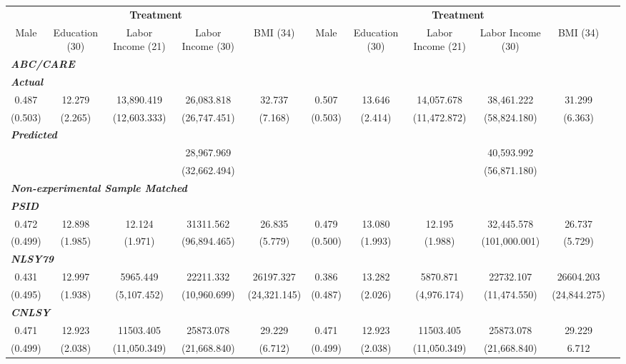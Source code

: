 \begin{tabular}{ccccccccccc} \hline \hline
\multicolumn{5}{c}{\textbf{Treatment}} & \multicolumn{5}{c}{\textbf{Treatment}} \\
Male  & Education (30)  & Labor Income (21) & Labor Income (30)  & BMI (34) & Male  & Education (30)  & Labor Income (21) & Labor Income (30)  & BMI (34)  \\  \midrule
\multicolumn{10}{l}{\textit{\textbf{ABC/CARE}}} \\
\multicolumn{10}{l}{\textit{\textbf{Actual}}} \\
    0.487 &    12.279 & 13,890.419 & 26,083.818 &    32.737 &     0.507 &    13.646 & 14,057.678 & 38,461.222 &    31.299 \\  
    (0.503) &     (2.265) & (12,603.333) & (26,747.451) &     (7.168) &     (0.503) &     (2.414) & (11,472.872) & (58,824.180) &     (6.363) \\  
\multicolumn{10}{l}{\textit{\textbf{Predicted}}} \\
        &         &         & 28,967.969 &         &         &         &         & 40,593.992 &         \\  
        &         &         & (32,662.494) &         &         &         &         & (56,871.180) &         \\  
        \multicolumn{10}{l}{\textit{\textbf{Non-experimental Sample Matched}}} \\
\multicolumn{10}{l}{\textit{\textbf{PSID}}} \\
    0.472 &    12.898 &    12.124 & 31311.562 &    26.835 &     0.479 &    13.080 &    12.195 & 32,445.578 &    26.737 \\  
    (0.499) &     (1.985) &     (1.971) & (96,894.465) &     (5.779) &     (0.500) &     (1.993) &     (1.988) &  (101,000.001) &     (5.729) \\  
\multicolumn{10}{l}{\textit{\textbf{NLSY79}}} \\
    0.431 &    12.997 &  5965.449 & 22211.332 & 26197.327 &     0.386 &    13.282 &  5870.871 & 22732.107 & 26604.203 \\  
    (0.495) &     (1.938) &  (5,107.452) & (10,960.699) & (24,321.145) &     (0.487) &     (2.026) &  (4,976.174) & (11,474.550) & (24,844.275) \\  
    \multicolumn{10}{l}{\textit{\textbf{CNLSY}}} \\
    0.471 &    12.923 & 11503.405 & 25873.078 &    29.229 &     0.471 &    12.923 & 11503.405 & 25873.078 &    29.229 \\  
    (0.499) &     (2.038) & (11,050.349) & (21,668.840) &     (6.712) &     (0.499) &     (2.038) & (11,050.349) & (21,668.840) &     6.712 \\ 

\end{tabular}

